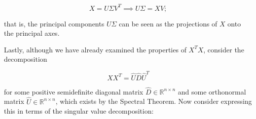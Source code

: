 \[
X = U \Sigma V^T \implies U \Sigma = XV;
\]

that is, the principal components \(U \Sigma\) can be seen as the projections of \(X\) onto the principal axes.

%
%
%
%
%
%
%

Lastly, although we have already examined the properties of \(X^TX\), consider the decomposition

\begin{equation}\label{linalg.svd.5.decomp}
XX^T = \hat{U} \hat{D} \hat{U}^T
\end{equation}

for some positive semidefinite diagonal matrix \(\hat{D} \in \mathbb{R}^{n \times n}\) and some orthonormal matrix \(\hat{U} \in \mathbb{R}^{n \times n}\), which exists by the Spectral Theorem. Now consider expressing this in terms of the singular value decomposition:

